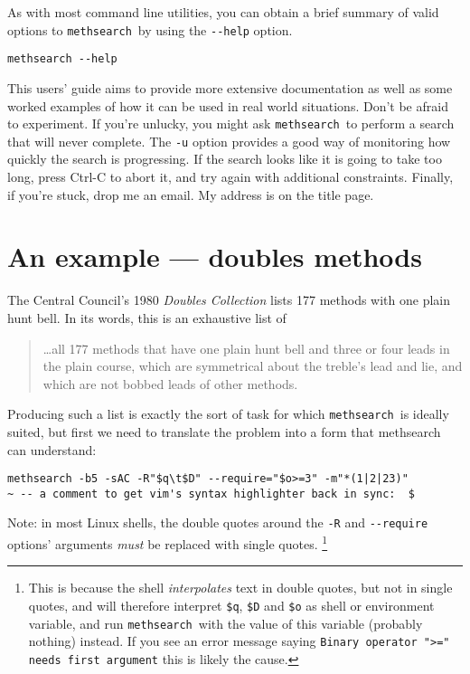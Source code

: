 \documentclass[a4paper,11pt,oneside]{book}
\makeatletter
\newcommand{\loi}[1]{\index{#1@{\hspace*{-\loptwidth}\texttt{--#1}}}}
\def\methsearch{\texttt{meth\-search}}
\makeatother
\begin{document}
As with most command line utilities, you can obtain a brief summary 
of valid options to \methsearch\ by using the \verb+--help+ option.%

\begin{Verbatim}
methsearch --help
\end{Verbatim}
\loi{help}

This users' guide aims to provide more extensive documentation as 
well as some worked examples of how it can be used in real world situations.
Don't be afraid to experiment.  If you're unlucky, you might
ask \methsearch\ to perform a search that will never complete.  
The \verb+-u+ option provides a good way of monitoring how quickly 
the search is progressing.  If the search looks like it is going to take
too long, press Ctrl-C to abort it, and try again with additional constraints.
Finally, if you're stuck, drop me an email.  My address is on the title page.

\section{An example — doubles methods}\label{eg_doubles}

The Central Council's 1980 \textit{Doubles Collection}%
lists 177 methods with one plain hunt bell.  
In its words, this is an exhaustive list of 
\begin{quote}
\ldots all 177 methods that have one plain hunt bell and three or four leads in
the plain course, which are symmetrical about the treble's lead and lie,
and which are not bobbed leads of other methods.
\end{quote}
Producing such a list is exactly the sort of task for which 
\methsearch\ is ideally suited, but first we need to translate the problem
into a form that methsearch can understand:

\begin{Verbatim}[commentchar=~]
methsearch -b5 -sAC -R"$q\t$D" --require="$o>=3" -m"*(1|2|23)"
~ -- a comment to get vim's syntax highlighter back in sync:  $
\end{Verbatim}

Note: in most Linux shells, 
the double quotes around the \verb+-R+ and \verb+--require+ options' arguments 
\textit{must} be replaced with single quotes.%
\footnote{This is because the shell 
\textit{interpolates} text in double quotes,
but not in single quotes,  and will therefore interpret 
\verb+$q+, \verb+$D+ and \verb+$o+ as shell or environment variable, and 
run \methsearch\ with the value of this variable (probably nothing) instead.
If you see an error message saying 
\texttt{Binary operator ">=" needs first argument}
this is likely the cause.}
\end{document}
